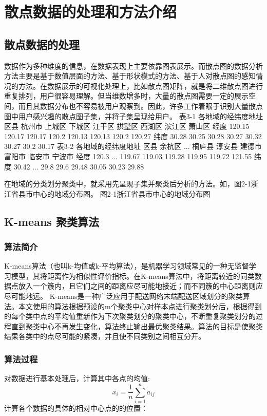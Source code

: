 \clearpage
\section{散点数据的处理和方法介绍}

\subsection{散点数据的处理}
数据作为多种维度的信息，在数据表现上主要依靠图表展示。而散点图的数据分析方法主要是基于数值层面的方法、基于形状模式的方法、基于人对散点图的感知情况的方法。在数据展示的可视化处理上，比如散点图矩阵，就是将二维散点图进行重复排列，用户很容易理解。但当维数增多时，大量的散点图需要一定的展示空间，而且其数据分布也不容易被用户观察到。因此，许多工作着眼于识别大量散点图中用户感兴趣的散点图子集，并将子集呈现给用户。
表3-1 各地域的经纬度地址
区县	杭州市	上城区	下城区	江干区	拱墅区	西湖区	滨江区	萧山区
经度	120.15	120.17	120.17	120.2	120.13	120.13	120.2	120.27
纬度	30.28	30.25	30.28	30.27	30.32	30.27	30.2	30.17
表3-2 各地域的经纬度地址
区县	余杭区	...	桐庐县	淳安县	建德市	富阳市	临安市	宁波市
经度	120.3	...	119.67	119.03	119.28	119.95	119.72	121.55
纬度	30.42	...	29.8	29.6	29.48	30.05	30.23	29.88

在地域的分类划分聚类中，就采用先呈现子集并聚类后分析的方法。如，图2-1浙江省县市中心的地域分布图。
图2-1浙江省县市中心的地域分布图

\subsection{K-means 聚类算法}
\subsubsection{算法简介}
K-means算法（也叫k-均值或k-平均算法），是机器学习领域常见的一种无监督学习模型，其将距离作为相似性评价指标。在K-means算法中，将距离较近的同类数据点放入一个簇内，且它们之间的距离应尽可能地接近；而不同簇的中心距离则应尽可能地远。
K-means是一种广泛应用于配送网络末端配送区域划分的聚类算法。本文使用的算法根据预设的m个聚类中心对样本点进行聚类划分后，根据得到的每个类中点的平均值重新作为下次聚类划分的聚类中心，不断重复聚类划分的过程直到聚类中心不再发生变化，算法终止输出最优聚类结果。算法的目标是使聚类结果各类中的点尽可能的紧凑，并且使不同类别之间相互分开。

\subsubsection{算法过程}
对数据进行基本处理后，计算其中各点的均值:
\begin{equation}
    \overline{x_i} = \frac{1}{n}\sum_{i=1}^na_{ij}
    \end{equation}
计算各个数据的具体的相对中心点的的位置：
 
